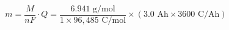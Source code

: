 \documentclass[preview]{standalone}
\begin{document}
\[m = \frac{M}{nF} \cdot Q = \frac{6.941 \text{ g/mol}}{1 \times 96{,}485 \text{ C/mol}} \times (3.0 \text{ Ah} \times 3600 \text{ C/Ah})\]
\end{document}
